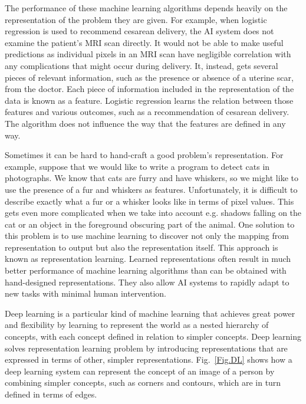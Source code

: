 The performance of these machine learning algorithms depends heavily on the representation of the problem they are given. For example, when logistic regression is used to recommend cesarean delivery, the AI system does not examine the patient's MRI scan directly. It would not be able to make useful predictions as individual pixels in an MRI scan have negligible correlation with any complications that might occur during delivery. It, instead, gets several pieces of relevant information, such as the presence or absence of a uterine scar, from the doctor. Each piece of information included in the representation of the data is known as a feature. Logistic regression learns the relation between those features and various outcomes, such as a recommendation of cesarean delivery. The algorithm does not influence the way that the features are defined in any way.

Sometimes it can be hard to hand-craft a good problem's representation. For example, suppose that we would like to write a program to detect cats in photographs. We know that cats are furry and have whiskers, so we might like to use the presence of a fur and whiskers as features. Unfortunately, it is difficult to describe exactly what a fur or a whisker looks like in terms of pixel values. This gets even more complicated when we take into account e.g. shadows falling on the cat or an object in the foreground obscuring part of the animal.
One solution to this problem is to use machine learning to discover not only the mapping from representation to output but also the representation itself. This approach is known as representation learning. Learned representations often result in much better performance of machine learning algorithms than can be obtained with hand-designed representations. They also allow AI systems to rapidly adapt to new tasks with minimal human intervention.

Deep learning is a particular kind of machine learning that achieves great power and flexibility by learning to represent the world as a nested hierarchy of concepts, with each concept defined in relation to simpler concepts. Deep learning solves representation learning problem by introducing representations that are expressed in terms of other, simpler representations. Fig.~\ref{Fig.DL} shows how a deep learning system can represent the concept of an image of a person by combining simpler concepts, such as corners and contours, which are in turn defined in terms of edges.

